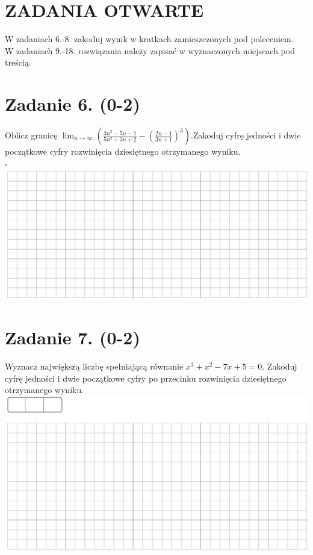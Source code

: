 \documentclass[10pt]{article}
\begin{document}
\section*{ZADANIA OTWARTE}
W zadaniach 6.-8. zakoduj wynik w kratkach zamieszczonych pod poleceniem.\\
W zadaniach 9.-18. rozwiązania należy zapisać w wyznaczonych miejscach pod treścią.

\section*{Zadanie 6. (0-2)}
Oblicz granicę \(\lim _{n \rightarrow \infty}\left(\frac{3 n^{2}-5 n-7}{5 n^{2}+3 n+2}-\left(\frac{2 n-1}{3 n+1}\right)^{3}\right)\).Zakoduj cyfrę jedności i dwie początkowe cyfry rozwinięcia dziesiętnego otrzymanego wyniku.\\
\(\square\)\\
\includegraphics[max width=\textwidth, center]{2024_11_21_c0ca116654784d42326bg-04}

\section*{Zadanie 7. (0-2)}
Wyznacz największą liczbę spełniającą równanie \(x^{3}+x^{2}-7 x+5=0\). Zakoduj cyfrę jedności i dwie początkowe cyfry po przecinku rozwinięcia dziesiętnego otrzymanego wyniku.\\
\includegraphics[max width=\textwidth, center]{2024_11_21_c0ca116654784d42326bg-04(1)}
\end{document}
